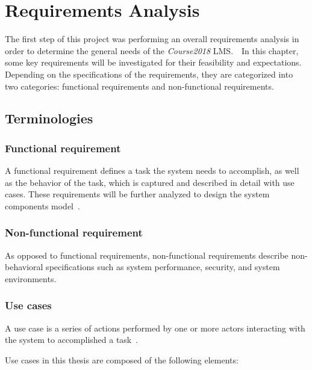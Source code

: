 

\chapter{Requirements Analysis}
\label{chap:REQS}

The first step of this project was performing an overall requirements analysis
in order to determine the general needs of the \emph{Course2018} LMS.\ \ 
In this chapter, some key requirements will be investigated for their
feasibility and expectations.
Depending on the specifications of the requirements, they are categorized into
two categories: functional requirements and non-functional requirements.

\section{Terminologies}

\subsection{Functional requirement}
\label{sec:FUNC_REQS}
A functional requirement defines a task the system needs to accomplish,
as well as the behavior of the task, which is captured and described in detail
with use cases.
These requirements will be further analyzed to design the system components
model~\cite{functionalReqs}.

\subsection{Non-functional requirement}
As opposed to functional requirements, non-functional requirements describe
non-behavioral specifications such as system performance, security, and system
environments.

\subsection{Use cases}
A use case is a series of actions performed by one or more actors interacting
with the system to accomplished a task~\cite{useCase}.

\medskip 

Use cases in this thesis are composed of the following elements:

